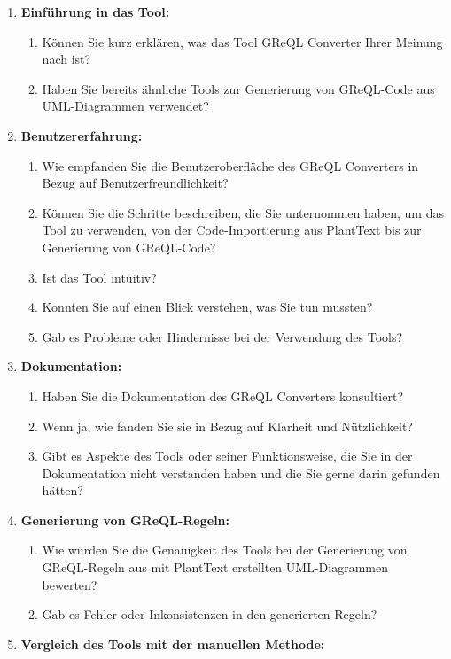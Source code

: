 \begin{enumerate}
    \item \textbf{Einführung in das Tool:}
    \begin{enumerate}
        \item Können Sie kurz erklären, was das Tool GReQL Converter Ihrer Meinung nach ist?
        \item Haben Sie bereits ähnliche Tools zur Generierung von GReQL-Code aus UML-Diagrammen verwendet?
    \end{enumerate}
    \item \textbf{Benutzererfahrung:}
    \begin{enumerate}
        \item Wie empfanden Sie die Benutzeroberfläche des GReQL Converters in Bezug auf Benutzerfreundlichkeit?
        \item Können Sie die Schritte beschreiben, die Sie unternommen haben, um das Tool zu verwenden, von der
        Code-Importierung aus PlantText bis zur Generierung von GReQL-Code?
        \item Ist das Tool intuitiv?
        \item Konnten Sie auf einen Blick verstehen, was Sie tun mussten?
        \item Gab es Probleme oder Hindernisse bei der Verwendung des Tools?
    \end{enumerate}
    \item \textbf{Dokumentation:}
    \begin{enumerate}
        \item Haben Sie die Dokumentation des GReQL Converters konsultiert?
        \item Wenn ja, wie fanden Sie sie in Bezug auf Klarheit und Nützlichkeit?
        \item Gibt es Aspekte des Tools oder seiner Funktionsweise, die Sie in der Dokumentation nicht
        verstanden haben und die Sie gerne darin gefunden hätten?
    \end{enumerate}
    \item \textbf{Generierung von GReQL-Regeln:}
    \begin{enumerate}
        \item Wie würden Sie die Genauigkeit des Tools bei der Generierung von GReQL-Regeln aus mit PlantText
        erstellten UML-Diagrammen bewerten?
        \item Gab es Fehler oder Inkonsistenzen in den generierten Regeln?
    \end{enumerate}
    \item \textbf{Vergleich des Tools mit der manuellen Methode:}

\end{enumerate}
